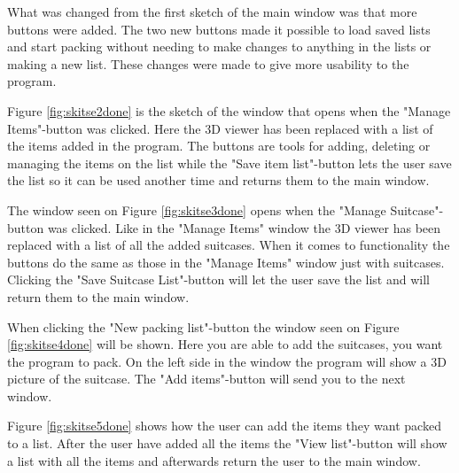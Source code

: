 
What was changed from the first sketch of the main window was that more buttons were added. The two new buttons made it possible to load saved lists and start packing without needing to make changes to anything in the lists or making a new list.
These changes were made to give more usability to the program.


Figure \ref{fig:skitse2done} is the sketch of the window that opens when the "Manage Items"-button was clicked. Here the 3D viewer has been replaced with a list of the items added in the program. The buttons are tools for adding, deleting or managing the items on the list while the "Save item list"-button lets the user save the list so it can be used another time and returns them to the main window.


The window seen on Figure \ref{fig:skitse3done} opens when the "Manage Suitcase"-button was clicked. Like in the "Manage Items" window the 3D viewer has been replaced with a list of all the added suitcases. When it comes to functionality the buttons do the same as those in the "Manage Items" window just with suitcases. Clicking the "Save Suitcase List"-button will let the user save the list and will return them to the main window.


When clicking the "New packing list"-button the window seen on Figure \ref{fig:skitse4done} will be shown. Here you are able to add the suitcases, you want the program to pack. On the left side in the window the program will show a 3D picture of the suitcase. The "Add items"-button will send you to the next window.


Figure \ref{fig:skitse5done} shows how the user can add the items they want packed to a list. After the user have added all the items the "View list"-button will show a list with all the items and afterwards return the user to the main window.

